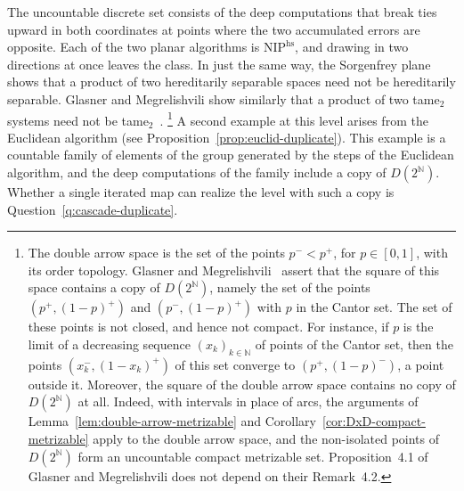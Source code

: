 \documentclass[psamsfonts]{amsart}
\theoremstyle{definition}
\theoremstyle{remark}
\newcommand{\NIP}{\text{NIP}}
\numberwithin{equation}{section}
\begin{document}
The uncountable discrete set consists of the deep computations that break ties upward in both coordinates at points where the two accumulated errors are opposite.
Each of the two planar algorithms is $\NIP^{\mathrm{hs}}$, and drawing in two directions at once leaves the class.
In just the same way, the Sorgenfrey plane shows that a product of two hereditarily separable spaces need not be hereditarily separable.
Glasner and Megrelishvili show similarly that a product of two tame$_2$ systems need not be tame$_2$~\cite[Proposition~4.1]{glasner2022tame}.%
\footnote{The double arrow space is the set of the points $p^-<p^+$, for $p\in[0,1]$, with its order topology.
  Glasner and Megrelishvili~\cite[Remark~4.2]{glasner2022tame} assert that the square of this space contains a copy of $D(2^{\mathbb{N}})$, namely the set of the points $(p^+,(1-p)^+)$ and $(p^-,(1-p)^+)$ with $p$ in the Cantor set.
  The set of these points is not closed, and hence not compact.
  For instance, if $p$ is the limit of a decreasing sequence $(x_k)_{k\in\mathbb{N}}$ of points of the Cantor set, then the points $(x_k^-,(1-x_k)^+)$ of this set converge to $(p^+,(1-p)^-)$, a point outside it.
  Moreover, the square of the double arrow space contains no copy of $D(2^{\mathbb{N}})$ at all.
  Indeed, with intervals in place of arcs, the arguments of Lemma~\ref{lem:double-arrow-metrizable} and Corollary~\ref{cor:DxD-compact-metrizable} apply to the double arrow space, and the non-isolated points of $D(2^{\mathbb{N}})$ form an uncountable compact metrizable set.
  Proposition~4.1 of Glasner and Megrelishvili does not depend on their Remark~4.2.}
A second example at this level arises from the Euclidean algorithm (see Proposition~\ref{prop:euclid-duplicate}).
This example is a countable family of elements of the group generated by the steps of the Euclidean algorithm, and the deep computations of the family include a copy of $D(2^{\mathbb{N}})$.
Whether a single iterated map can realize the level with such a copy is Question~\ref{q:cascade-duplicate}.
\end{document}
